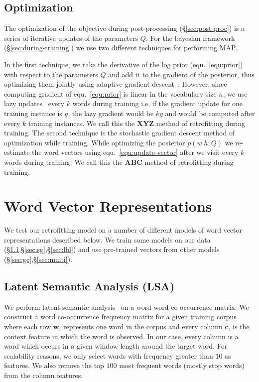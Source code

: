 \documentclass[11pt]{article}
\begin{document}
\subsection{Optimization}
\label{sec:optimization} 

The optimization of the objective during post-processing (\S\ref{sec:post-proc}) is a series of iterative
updates of the parameters $Q$. For the bayesian framework (\S\ref{sec:during-training}) we use two different
techniques for performing MAP. 

In the first technique, we take the derivative of the log prior (equ.~\ref{equ:prior}) with respect to the
parameters $Q$ and add it to the gradient of the posterior, thus optimizing them jointly
using adaptive gradient descent~\cite{Duchi:EECS-2010-24}.
However, since computing gradient of equ.~\ref{equ:prior}
is linear in the vocabulary size $n$, we use lazy updates~\cite{Carpenter08lazysparse} every
$k$ words during training i.e, if the gradient update for one training instance is $g$, the
lazy gradient would be $kg$ and would be computed after every $k$ training instances.
We call this the \textbf{XYZ} method of retrofitting during training.
The second technique is the stochastic gradient descent method of optimization 
while training. While optimizing the posterior $p(w|h;Q)$ we re-estimate the 
word vectors using equ.~\ref{equ:update-vector} after we visit every $k$ words during 
training. We call this the \textbf{ABC} method of retrofitting during training.

\section{Word Vector Representations}
\label{sec:vectors}

We test our retrofitting model on a number of different models of word vector
representations described below. We train some models on our data 
(\S\ref{sec:lsa},\S\ref{sec:sg},\S\ref{sec:lbl})
and use pre-trained vectors from other models (\S\ref{sec:gc},\S\ref{sec:multi}).

\subsection{Latent Semantic Analysis (LSA)}
\label{sec:lsa}

We perform latent semantic analysis~\cite{deerwester-90} on a word-word co-occurrence matrix.
We construct a word co-occurrence frequency matrix for a given training corpus where
each row $\boldsymbol{w}$, represents one word in the corpus and every column $\boldsymbol{c}$, is the context 
feature in which the word is observed. In our case, every column is a word which occurs
in a given window length around the target word. For scalability reasons, we
only select words with frequency greater than $10$ as features. We also remove
the top $100$ most frequent words (mostly stop words) from the column features.
\end{document}
